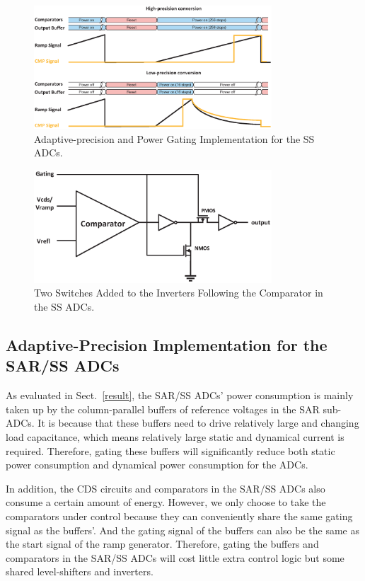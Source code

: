 \begin{figure}[htbp]
	\centerline{\includegraphics[width=3.5in]{./Figures/SS_pg.eps}}
	\caption{Adaptive-precision and Power Gating Implementation for the SS ADCs.}
	\label{SS_pg}
\end{figure} 

\begin{figure}[htbp]
	\centerline{\includegraphics[width=3.5in]{./Figures/MATE.eps}}
	\caption{Two Switches Added to the Inverters Following the Comparator in the SS ADCs.}
	\label{MATE}
\end{figure} 

\subsection{Adaptive-Precision Implementation for the SAR/SS ADCs}

As evaluated in Sect.~\ref{result}, the SAR/SS ADCs’ power consumption is mainly taken up by the column-parallel buffers of reference voltages in the SAR sub-ADCs.
It is because that these buffers need to drive relatively large and changing load capacitance, which means relatively large static and dynamical current is required.
Therefore, gating these buffers will significantly reduce both static power consumption and dynamical power consumption for the ADCs.

In addition, the CDS circuits and comparators in the SAR/SS ADCs also consume a certain amount of energy. However, we only choose to take the comparators under control because they can conveniently share the same gating signal as the buffers'. And the gating signal of the buffers can also be the same as the start signal of the ramp generator. Therefore, gating the buffers and comparators in the SAR/SS ADCs will cost little extra control logic but some shared level-shifters and inverters.

